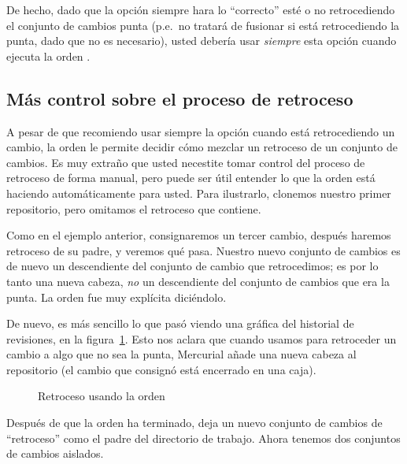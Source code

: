 De hecho, dado que la opción  siempre hara lo
``correcto'' esté o no retrocediendo el conjunto de cambios punta
(p.e.~no tratará de fusionar si está retrocediendo la punta, dado que
no es necesario), usted debería usar \emph{siempre} esta opción cuando
ejecuta la orden .

\subsection{Más control sobre el proceso de retroceso}

A pesar de que recomiendo usar siempre la opción 
 cuando está retrocediendo un cambio, la orden
 le permite decidir cómo mezclar un retroceso de un
conjunto de cambios.  Es muy extraño que usted necestite tomar control
del proceso de retroceso de forma manual, pero puede ser útil entender
lo que la orden  está haciendo automáticamente para
usted. Para ilustrarlo, clonemos nuestro primer repositorio, pero
omitamos el retroceso que contiene.

Como en el ejemplo anterior, consignaremos un tercer cambio, después
haremos retroceso de su padre, y veremos qué pasa.
Nuestro nuevo conjunto de cambios es de nuevo un descendiente del
conjunto de cambio que retrocedimos; es por lo tanto una nueva cabeza,
\emph{no} un descendiente del conjunto de cambios que era la punta. La
orden  fue muy explícita diciéndolo.

De nuevo, es más sencillo lo que pasó viendo una gráfica del
historial de revisiones, en la figura~\ref{fig:undo:backout-manual}.
Esto nos aclara que cuando usamos  para retroceder un
cambio a algo que no sea la punta, Mercurial añade una nueva cabeza al
repositorio (el cambio que consignó está encerrado en una caja).

\begin{figure}[htb]
  \centering
  \caption{Retroceso usando la orden }
  \label{fig:undo:backout-manual}
\end{figure}

Después de que la orden  ha terminado, deja un nuevo
conjunto de cambios de ``retroceso'' como el padre del directorio de trabajo.
Ahora tenemos dos conjuntos de cambios aislados.

